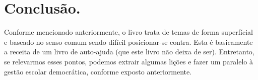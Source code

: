 \documentclass[a4paper,12pt]{article}
\begin{document}
\section{Conclusão.}

Conforme mencionado anteriormente, o livro trata de temas de forma superfícial e baseado no senso comum sendo difícil posicionar-se contra. Esta é basicamente a receita de um livro de auto-ajuda (que este livro não deixa de ser). Entretanto, se relevarmos esses pontos, podemos extrair algumas lições e fazer um paralelo à gestão escolar democrática, conforme exposto anteriormente.
\end{document}
